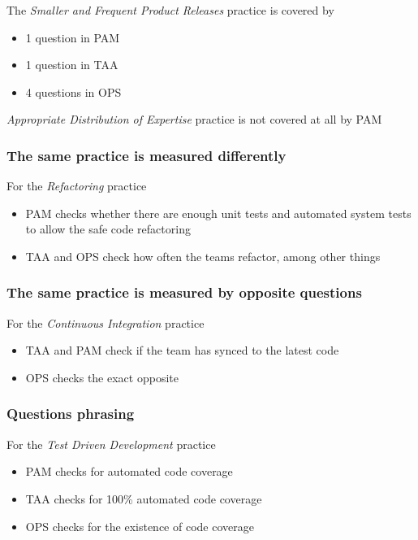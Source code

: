The \textit{Smaller and Frequent Product Releases} practice is covered by

\begin{itemize}
	\item 1 question in PAM
	\item 1 question in TAA
	\item 4 questions in OPS
\end{itemize}

\textit{Appropriate Distribution of Expertise} practice is not covered at all by PAM

\clearpage

\subsubsection*{The same practice is measured differently}

For the \textit{Refactoring} practice 

\begin{itemize}
	\item PAM checks whether there are enough unit tests and automated system tests to allow the safe code refactoring
	\item TAA and OPS check how often the teams refactor, among other things
\end{itemize}

\clearpage

\subsubsection*{The same practice is measured by opposite questions}

For the \textit{Continuous Integration} practice

\begin{itemize}
	\item TAA and PAM check if the team has synced to the latest code
	\item OPS checks the exact opposite
\end{itemize}

\clearpage

\subsubsection*{Questions phrasing}

For the \textit{Test Driven Development} practice

\begin{itemize}
	\item PAM checks for automated code coverage
	\item TAA checks for 100\% automated code coverage
	\item OPS checks for the existence of code coverage
\end{itemize}

